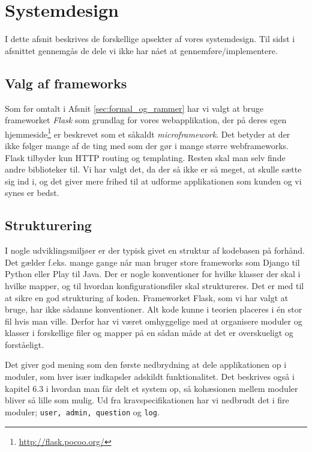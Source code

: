 \documentclass[11pt, a4paper]{article}
\begin{document}
\section{Systemdesign}
\label{sec:systemdesign}
I dette afsnit beskrives de forskellige apsekter af vores systemdesign. Til sidst i afsnittet gennemgås de dele vi ikke har nået at gennemføre/implementere.

\subsection{Valg af frameworks}
\label{sub:valg_af_frameworks}
Som før omtalt i Afsnit \ref{sec:formal_og_rammer} har vi valgt at bruge frameworket \emph{Flask} som grundlag for vores webapplikation, der på deres egen hjemmeside\footnote{\url{http://flask.pocoo.org/}} er beskrevet som et såkaldt \emph{microframework}. Det betyder at der ikke følger mange af de ting med som der gør i mange større webframeworks. Flask tilbyder kun HTTP routing og templating. Resten skal man selv finde andre biblioteker til. Vi har valgt det, da der så ikke er så meget, at skulle sætte sig ind i, og det giver mere frihed til at udforme applikationen som kunden og vi synes er bedst.

\subsection{Strukturering}
\label{sub:strukturering}
I nogle udviklingsmiljøer er der typisk givet en struktur af kodebasen på forhånd. Det gælder f.eks. mange gange når man bruger store frameworks som Django til Python eller Play til Java. Der er nogle konventioner for hvilke klasser der skal i hvilke mapper, og til hvordan konfigurationsfiler skal struktureres. Det er med til at sikre en god strukturing af koden. Frameworket Flask, som vi har valgt at bruge, har ikke sådanne konventioner. Alt kode kunne i teorien placeres i én stor fil hvis man ville. Derfor har vi været omhyggelige med at organisere moduler og klasser i forskellige filer og mapper på en sådan måde at det er overskueligt og forståeligt.

Det giver god mening som den første nedbrydning at dele applikationen op i moduler, som hver især indkapsler adskildt funktionalitet. Det beskrives også i kapitel 6.3 i \cite{OOSE} hvordan man får delt et system op, så kohæsionen mellem moduler bliver så lille som mulig. Ud fra kravspecifikationen har vi nedbrudt det i fire moduler; \texttt{user, admin, question} og \texttt{log}.
\end{document}
